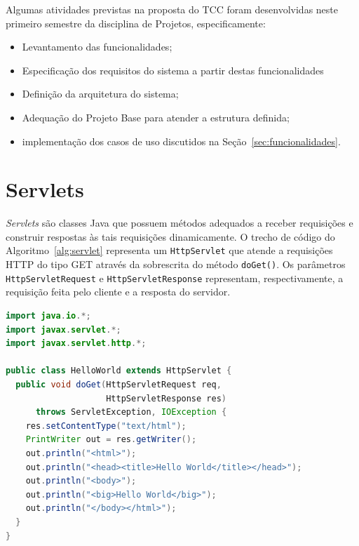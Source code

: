 \documentclass[
  10.5pt,				  %
	openright,			%
	twoside,			  %
  a5paper,
  chapter=TITLE,	%
	section=TITLE,	%
  hyphens,        %
	english,        %
	brazil          %
]{abntex2}
\begin{document}
Algumas atividades previstas na proposta do TCC foram desenvolvidas neste primeiro semestre da disciplina de Projetos, especificamente:
\begin{itemize}
  \item Levantamento das funcionalidades;
  \item Especificação dos requisitos do sistema a partir destas funcionalidades
  \item Definição da arquitetura do sistema;
  \item Adequação do Projeto Base para atender a estrutura definida;
  \item implementação dos casos de uso discutidos na Seção~\ref{sec:funcionalidades}.
\end{itemize}





%

\anexos

\chapter{Servlets}\label{anexo:servlets}

\emph{Servlets} são classes Java que possuem métodos adequados a receber requisições e construir respostas às tais requisições dinamicamente. O trecho de código do Algoritmo~\ref{alg:servlet} representa um \texttt{HttpServlet} que atende a requisições HTTP do tipo GET através da sobrescrita do método \texttt{doGet()}. Os parâmetros \texttt{HttpServletRequest} e \texttt{HttpServletResponse} representam, respectivamente, a requisição feita pelo cliente e a resposta do servidor.
%
\begin{lstlisting}[language=Java, caption={Um \emph{servlet} que imprime ``\emph{Hello World}''.}, label={alg:servlet}]
import java.io.*;
import javax.servlet.*;
import javax.servlet.http.*;

public class HelloWorld extends HttpServlet {
  public void doGet(HttpServletRequest req,
                    HttpServletResponse res)
      throws ServletException, IOException {
    res.setContentType("text/html");
    PrintWriter out = res.getWriter();
    out.println("<html>");
    out.println("<head><title>Hello World</title></head>");
    out.println("<body>");
    out.println("<big>Hello World</big>");
    out.println("</body></html>");
  }
}
\end{lstlisting}
\end{document}
